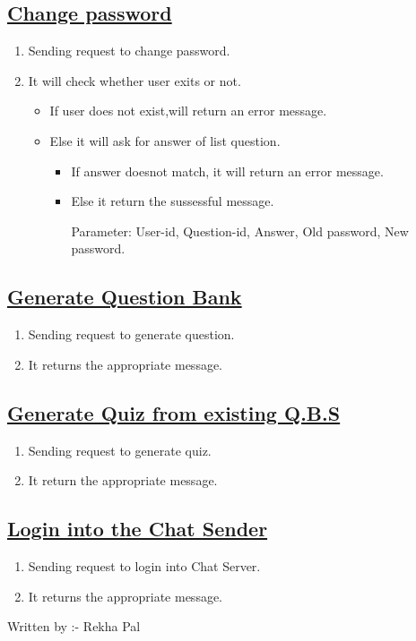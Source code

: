\documentclass{article}
\begin{document}
\subsection*{\underline{Change password}}
\begin{enumerate}

\item Sending request to change password.
	\item It will check whether user exits or not.
	     \begin{itemize}
			\item If user does not exist,will return an error message.
			 \item Else it will ask for answer of list question.
				\begin{itemize}
					\item If answer doesnot match, it will return an error message.
					\item Else it return the sussessful message.
				
						 Parameter: User-id, Question-id, Answer, Old password, New password.
				 \end{itemize}
		\end{itemize}


\begin{center}

\end{center}
\end{enumerate}
\subsection*{\underline{Generate Question Bank}}
\begin{enumerate}
	\item Sending request to generate question.
	\item It returns the appropriate message.
\begin{center}   

\end{center}
\end{enumerate}
\subsection*{\underline{Generate Quiz from existing Q.B.S}}
\begin{enumerate}
	\item Sending request to generate quiz.
	\item It return the appropriate message.
\begin{center}

\end{center}
\end{enumerate}
\subsection*{\underline{Login into the Chat Sender}}
\begin{enumerate}
\item Sending request to login into Chat Server.
\item It returns the appropriate message.

\begin{center}

\end{center}
\end{enumerate}

Written by :- Rekha Pal
\end{document}
